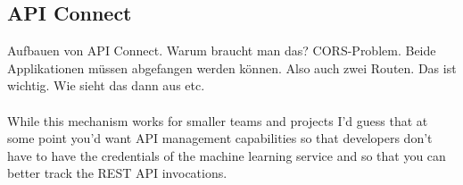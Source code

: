 \subsection{API Connect}
Aufbauen von API Connect. Warum braucht man das? CORS-Problem. Beide Applikationen müssen abgefangen werden können. Also
auch zwei Routen. Das ist wichtig. Wie sieht das dann aus etc.
\\ \\
While this mechanism works for smaller teams and projects I’d guess that at some point you’d want API management
capabilities so that developers don’t have to have the credentials of the machine learning service and so that you can
better track the REST API invocations.